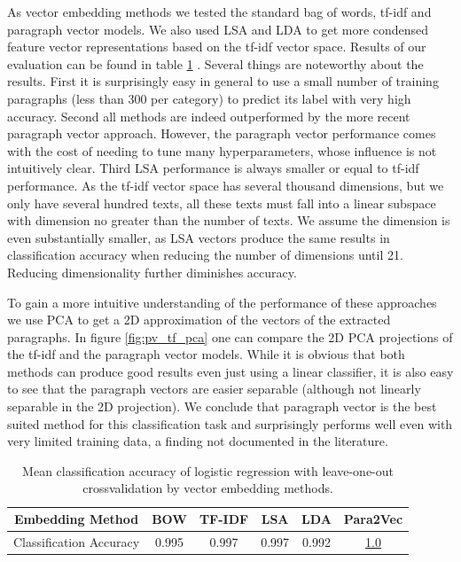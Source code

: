 As vector embedding methods we tested the standard bag of words, tf-idf and paragraph vector models. We also used LSA and LDA to get more condensed feature vector representations based on the tf-idf vector space. Results of our evaluation can be found in table \ref{table:para_class_acc}   . Several things are noteworthy about the results. First it is surprisingly easy in general to use a small number of training paragraphs (less than 300 per category) to predict its label with very high accuracy. Second all methods are indeed outperformed by the more recent paragraph vector approach. However, the paragraph vector performance comes with the cost of needing to tune many hyperparameters, whose influence is not intuitively clear. Third LSA performance is always smaller or equal to tf-idf performance. As the tf-idf vector space has several thousand dimensions, but we only have several hundred texts, all these texts must fall into a linear subspace with dimension no greater than the number of texts. We assume the dimension is even substantially smaller, as LSA vectors produce the same results in classification accuracy when reducing the number of dimensions until 21. Reducing dimensionality further diminishes accuracy. 

To gain a more intuitive understanding of the performance of these approaches we use PCA to get a 2D approximation of the vectors of the extracted paragraphs. In figure \ref{fig:pv_tf_pca} one can compare the 2D PCA projections of the tf-idf and the paragraph vector models. While it is obvious that both methods can produce good results even just using a linear classifier, it is also easy to see that the paragraph vectors are easier separable (although not linearly separable in the 2D projection). We conclude that paragraph vector is the best suited method for this classification task and surprisingly performs well even with very limited training data, a finding not documented in the literature.
\begin{table}
\begin{tabular}{|c|c|c|c|c|c|}
	\hline 
	Embedding Method & BOW & TF-IDF & LSA & LDA  & Para2Vec\tabularnewline
	\hline 
	\hline 
	Classification Accuracy & 0.995 & 0.997 & 0.997 & 0.992 & \underline{1.0}\tabularnewline
	\hline 
\end{tabular}
	\caption{Mean classification accuracy of logistic regression with leave-one-out crossvalidation by vector embedding methods.}
	\label{table:para_class_acc}
\end{table}

